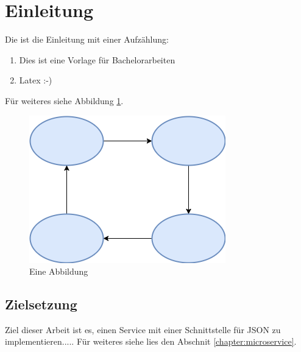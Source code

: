 \section{Einleitung}
\label{chapter:Einleitung}

Die ist die Einleitung mit einer Aufzählung: 

\begin{enumerate}
\item Dies ist eine Vorlage für Bachelorarbeiten
\item Latex :-)
\end{enumerate}

Für weiteres siehe Abbildung \ref{fig:beispiel_abbildung}. 

\begin{figure}[htb]
\centering
\includegraphics[width=\linewidth]{img/beispiel} 
\caption{Eine Abbildung }
\label{fig:beispiel_abbildung}
\end{figure}

\subsection{Zielsetzung}
\label{chapter:Zielsetzung}
Ziel dieser Arbeit ist es, einen Service mit einer Schnittstelle für JSON zu implementieren..... Für weiteres siehe lies den Abschnit \ref{chapter:microservice}.